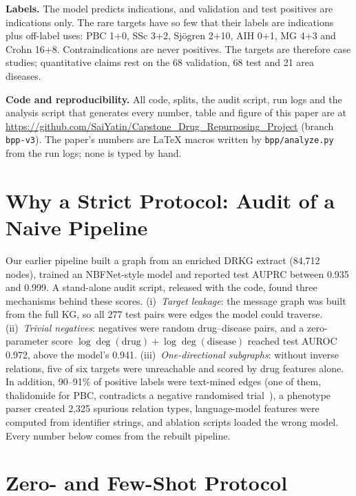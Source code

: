 \documentclass{ieeeaccess}
\begin{document}
\textbf{Labels.} The model predicts indications, and validation and test positives are indications only. The rare targets have so few that their labels are indications plus off-label uses: PBC 1+0, SSc 3+2, Sj\"ogren 2+10, AIH 0+1, MG 4+3 and Crohn 16+8. Contraindications are never positives. The targets are therefore case studies; quantitative claims rest on the 68 validation, 68 test and 21 area diseases.

\textbf{Code and reproducibility.} All code, splits, the audit script, run logs and the analysis script that generates every number, table and figure of this paper are at \url{https://github.com/SaiYatin/Capstone_Drug_Repurposing_Project} (branch \texttt{bpp-v3}). The paper's numbers are \LaTeX{} macros written by \texttt{bpp/analyze.py} from the run logs; none is typed by hand.

\section{Why a Strict Protocol: Audit of a Naive Pipeline}
\label{sec:audit}
Our earlier pipeline built a graph from an enriched DRKG extract (84,712 nodes), trained an NBFNet-style model and reported test AUPRC between 0.935 and 0.999. A stand-alone audit script, released with the code, found three mechanisms behind these scores. (i)~\emph{Target leakage}: the message graph was built from the full KG, so all 277 test pairs were edges the model could traverse. (ii)~\emph{Trivial negatives}: negatives were random drug--disease pairs, and a zero-parameter score $\log\deg(\text{drug})+\log\deg(\text{disease})$ reached test AUROC 0.972, above the model's 0.941. (iii)~\emph{One-directional subgraphs}: without inverse relations, five of six targets were unreachable and scored by drug features alone. In addition, 90--91\% of positive labels were text-mined edges (one of them, thalidomide for PBC, contradicts a negative randomised trial~\cite{mccormick1994thalidomide}), a phenotype parser created 2,325 spurious relation types, language-model features were computed from identifier strings, and ablation scripts loaded the wrong model. Every number below comes from the rebuilt pipeline.

\section{Zero- and Few-Shot Protocol}
\label{sec:protocol}
\end{document}
